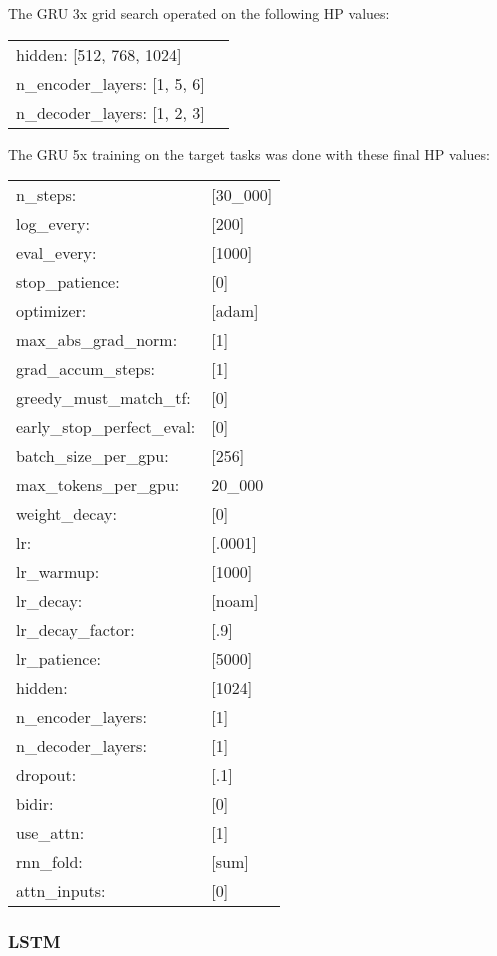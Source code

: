 The GRU 3x grid search operated on the following HP values:

\begin{tabular}{ll}
   hidden: [512, 768, 1024] \\
    n\_encoder\_layers: [1, 5, 6] \\
    n\_decoder\_layers: [1, 2, 3] \\
\end{tabular}
\vskip 0.15in

The GRU 5x training on the target tasks was done with these final HP values:

\begin{tabular}{ll}
    n\_steps: & [30\_000] \\  
    log\_every: & [200] \\
    eval\_every: & [1000] \\
    stop\_patience: & [0] \\
    optimizer: & [adam] \\    
    max\_abs\_grad\_norm: & [1] \\
    grad\_accum\_steps: & [1] \\
    greedy\_must\_match\_tf: & [0] \\
    early\_stop\_perfect\_eval: & [0] \\
    batch\_size\_per\_gpu: & [256] \\
    max\_tokens\_per\_gpu: & 20\_000   \\
    weight\_decay: & [0] \\
    lr: & [.0001] \\
    lr\_warmup: & [1000] \\
    lr\_decay: & [noam] \\
    lr\_decay\_factor: & [.9] \\
    lr\_patience: & [5000] \\
    hidden: & [1024] \\
    n\_encoder\_layers: & [1] \\
    n\_decoder\_layers: & [1] \\
    dropout: & [.1] \\
    bidir: & [0] \\
    use\_attn: & [1] \\
    rnn\_fold: & [sum] \\
    attn\_inputs: & [0] \\  
\end{tabular}
\vskip 0.15in

\pagebreak

\fi
\subsubsection{LSTM}

